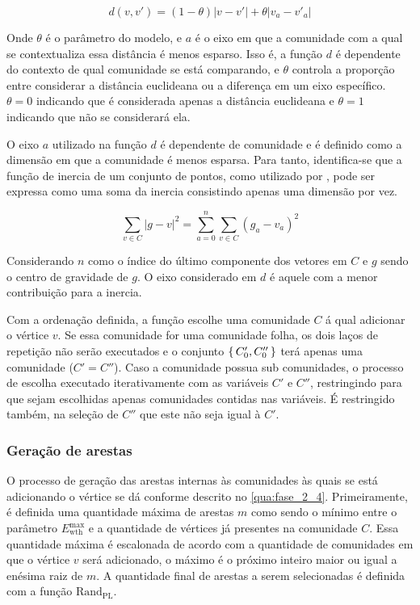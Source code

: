 \documentclass[notes.tex]{subfiles}
\begin{document}
\begin{equation}
d(v, v') = (1-\theta)|v-v'| + \theta|v_a - v'_a|
\end{equation}

Onde $\theta$ é o parâmetro do modelo, e  $a$ é o eixo em que a comunidade com a qual se contextualiza essa distância é menos esparso. 
Isso é, a função $d$ é dependente do contexto de qual comunidade se está comparando, e $\theta$ controla a proporção entre considerar a distância euclideana ou a diferença em um eixo específico.
$\theta = 0$ indicando que é considerada apenas a distância euclideana e $\theta = 1$ indicando que não se considerará ela.

O eixo $a$ utilizado na função $d$ é dependente de comunidade e é definido como a dimensão em que a comunidade é menos esparsa.
Para tanto, identifica-se que a função de inercia de um conjunto de pontos, como utilizado por , pode ser expressa como uma soma da inercia consistindo apenas uma dimensão por vez.

\begin{equation}
\sum_{v \in C} |g-v|^2 = \sum_{a=0}^{n}\sum_{v \in C}(g_a - v_a)^2
\end{equation}

Considerando $n$ como o índice do último componente dos vetores em $C$ e $g$ sendo o centro de gravidade de $g$.
O eixo considerado em $d$ é aquele com a menor contribuição para a inercia.

Com a ordenação definida, a função escolhe uma comunidade $C$ á qual adicionar o vértice $v$.
Se essa comunidade for uma comunidade folha, os dois laços de repetição não serão executados e o conjunto $\set{C'_0, C''_0}$ terá apenas uma comunidade ($C' = C''$).
Caso a comunidade possua sub comunidades, o processo de escolha executado iterativamente com as variáveis $C'$ e  $C''$, restringindo para que sejam escolhidas apenas comunidades contidas nas variáveis.
É restringido também, na seleção de $C''$ que este não seja igual à  $C'$.

\subsubsection{Geração de arestas}

O processo de geração das arestas internas às comunidades às quais se está adicionando o vértice se dá conforme descrito no \autoref{qua:fase_2_4}.
Primeiramente, é definida uma quantidade máxima de arestas $m$ como sendo o mínimo entre o parâmetro $E_\text{wth}^\text{max}$ e a quantidade de vértices já presentes na comunidade $C$.
Essa quantidade máxima é escalonada de acordo com a quantidade de comunidades em que o vértice $v$ será adicionado, o máximo é o próximo inteiro maior ou igual a enésima raiz de $m$.
A quantidade final de arestas a serem selecionadas é definida com a função $\text{Rand}_\text{PL}$.
\end{document}
